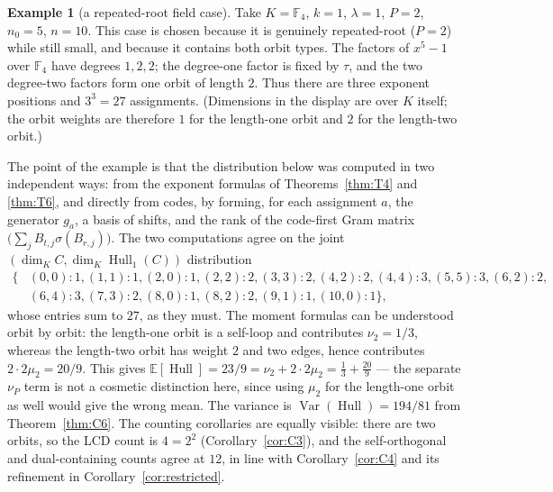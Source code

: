 \documentclass[11pt]{article}
\theoremstyle{definition}
\newtheorem{example}[theorem]{Example}
\theoremstyle{remark}
\newcommand{\Hull}{\operatorname{Hull}}
\newcommand{\E}{\mathbb{E}}
\begin{document}
\begin{example}[a repeated-root field case]\label{ex:E3}
Take \(K = \mathbb{F}_4\), \(k=1\), \(\lambda=1\), \(P=2\), \(n_0=5\),
\(n=10\). This case is chosen because it is genuinely repeated-root
(\(P=2\)) while still small, and because it contains both orbit types.
The factors of \(x^5-1\) over \(\mathbb{F}_4\) have degrees
\(1,2,2\); the degree-one factor is fixed by \(\tau\), and the two
degree-two factors form one orbit of length \(2\). Thus there are three
exponent positions and \(3^3=27\) assignments. (Dimensions in the
display are over \(K\) itself; the orbit weights are therefore \(1\)
for the length-one orbit and \(2\) for the length-two orbit.)

The point of the example is that the distribution below was computed
in two independent ways: from the exponent formulas of
Theorems~\ref{thm:T4} and \ref{thm:T6}, and directly from codes, by
forming, for each assignment \(a\), the generator \(g_a\), a basis of
shifts, and the rank of the code-first Gram matrix
\(\big(\sum_j B_{t,j}\sigma(B_{r,j})\big)\). The two computations
agree on the joint \((\dim_K C, \dim_K \Hull_1(C))\) distribution
\[
\begin{aligned}
\{&(0,0):1, (1,1):1, (2,0):1, (2,2):2, (3,3):2, (4,2):2, (4,4):3,
(5,5):3, (6,2):2,\\
&(6,4):3, (7,3):2, (8,0):1, (8,2):2, (9,1):1, (10,0):1\},
\end{aligned}
\]
whose entries sum to \(27\), as they must. The moment formulas can be
understood orbit by orbit: the length-one orbit is a self-loop and
contributes \(\nu_2 = 1/3\), whereas the length-two orbit has weight
\(2\) and two edges, hence contributes \(2 \cdot 2\mu_2 = 20/9\).
This gives
\(\E[\Hull] = 23/9 = \nu_2 + 2\cdot 2\mu_2 = \tfrac13 +
\tfrac{20}{9}\) --- the separate \(\nu_P\) term is not a cosmetic
distinction here, since using \(\mu_2\) for the length-one orbit as
well would give the wrong mean. The variance is
\(\operatorname{Var}(\Hull) = 194/81\) from Theorem~\ref{thm:C6}.
The counting corollaries are equally visible: there are two orbits, so
the LCD count is \(4 = 2^2\) (Corollary~\ref{cor:C3}), and the
self-orthogonal and dual-containing counts agree at \(12\), in line
with Corollary~\ref{cor:C4} and its refinement in
Corollary~\ref{cor:restricted}.
\end{example}
\end{document}
